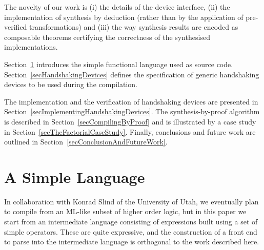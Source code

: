 \documentclass{llncs}
\begin{document}
The novelty of our work is (i) the details of the device interface,
(ii) the implementation of synthesis by deduction (rather than by the
application of pre-verified transformations) and (iii) the way
synthesis results are encoded as composable theorems certifying the
correctness of the synthesised implementations.

Section~\ref{secASimpleLanguage} introduces the simple functional
language used as source code.  Section~\ref{secHandshakingDevices}
defines the specification of generic handshaking devices to be used
during the compilation.

The implementation and the verification of handshaking devices are
presented in Section~\ref{secImplementingHandshakingDevices}. 
The synthesis-by-proof algorithm is described in Section~\ref{secCompilingByProof}
and is illustrated by a case study in Section~\ref{secTheFactorialCaseStudy}.
Finally, conclusions and future work are
outlined in Section~\ref{secConclusionAndFutureWork}.

\section{A Simple Language}
\label{secASimpleLanguage}
In collaboration with Konrad Slind of the University of Utah, we
eventually plan to compile from an ML-like subset of higher order
logic, but in this paper we start from an intermediate language
consisting of expressions built using a set of simple operators.
These are quite expressive, and the construction of a front end to
parse into the intermediate language is orthogonal to the work
described here.
\end{document}
